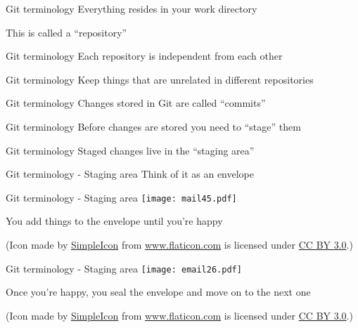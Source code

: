 \documentclass{beamer}
\begin{document}
\begin{frame}{Git terminology}
  \center
  \Huge Everything resides in your work directory

  \huge This is called a ``repository''
\end{frame}

\begin{frame}{Git terminology}
  \center
  \Huge Each repository is independent from each other
\end{frame}

\begin{frame}{Git terminology}
  \center
  \Huge Keep things that are unrelated in different repositories
\end{frame}

\begin{frame}{Git terminology}
  \center
  \Huge Changes stored in Git are called ``commits''
\end{frame}

\begin{frame}{Git terminology}
  \center
  \Huge Before changes are stored you need to ``stage'' them
\end{frame}

\begin{frame}{Git terminology}
  \center
  \Huge Staged changes live in  the ``staging area''
\end{frame}

\begin{frame}{Git terminology - Staging area}
  \center
  \Huge Think of it as an envelope
\end{frame}

\begin{frame}{Git terminology - Staging area}
  \center
  \texttt{[image: mail45.pdf]}

  \Large You add things to the envelope until you're happy

  \vspace{2cm}
  \scriptsize (Icon made by \href{http://www.simpleicon.com}{SimpleIcon}
  from \href{http://www.flaticon.com}{www.flaticon.com} is licensed
  under \href{http://creativecommons.org/licenses/by/3.0/}{CC BY 3.0}.)
\end{frame}

\begin{frame}{Git terminology - Staging area}
  \center
  \texttt{[image: email26.pdf]}

  \Large Once you're happy, you seal the envelope and move on to the next one

  \vspace{2cm}
  \scriptsize (Icon made by \href{http://www.simpleicon.com}{SimpleIcon}
  from \href{http://www.flaticon.com}{www.flaticon.com} is licensed
  under \href{http://creativecommons.org/licenses/by/3.0/}{CC BY 3.0}.)
\end{frame}
\end{document}
